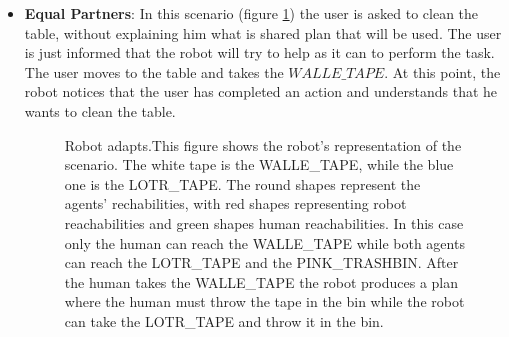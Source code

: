 \begin{itemize}
  \item
\textbf{Equal Partners}:
In this scenario (figure \ref{fig:case_study-helper-scenario1}) the user is asked to clean the table, without explaining him what is shared plan that will be used. The user is just informed that
the robot will try to help as it can to perform the task. The user moves to the table and
takes the $WALLE\_TAPE$. At this point, the robot notices that the user
has completed an action and understands that he wants to clean the
table.
\begin{figure}
  \caption{Robot adapts.This figure shows the robot's representation of the scenario. The white tape is the WALLE\_TAPE, while the blue
    one is the LOTR\_TAPE. The round shapes represent the agents'
    rechabilities, with red shapes representing robot reachabilities
    and green shapes human reachabilities. In this case only the human
  can reach the WALLE\_TAPE while both agents can reach the LOTR\_TAPE
and the PINK\_TRASHBIN. After the human takes the WALLE\_TAPE the
robot produces a plan where the human must throw the tape in the
bin while the robot can take the LOTR\_TAPE and throw it in the
bin.
}
\centering
  \label{fig:case_study-helper-scenario1}
\end{figure}


\end{itemize}
